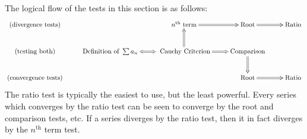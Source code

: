 The logical flow of the tests in this section is as follows:
\[\xymatrix{ \text{(divergence tests)} & & n^\text{th} \text{ term} \ar@{=>}[r] & \text{Root} \ar@{=>}[r] & \text{Ratio} \\
\text{(testing both)} & \text{Definition of }\sum a_n \ar@{<=>}[r] & \text{ Cauchy Criterion} \ar@{=>}[u] \ar@{=>}[r] & \text{Comparison} \ar@{=>}[d]& \\
\text{(convergence tests)} &&& \text{Root} \ar@{=>}[r] & \text{Ratio}
}\] 
The ratio test is typically the easiest to use, but the least powerful. Every series which converges by the ratio test can be seen to converge by the root and comparison tests, etc. If a series diverges by the ratio test, then it in fact diverges by the $n^\text{th}$ term test.

\clearpage

